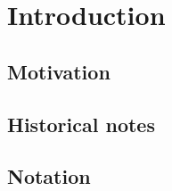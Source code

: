\chapter{Introduction}
\ifpdf
    \graphicspath{{Introduction/IntroductionFigs/PNG/}{Introduction/IntroductionFigs/PDF/}{Introduction/IntroductionFigs/}}
\else
    \graphicspath{{Introduction/IntroductionFigs/EPS/}{Introduction/IntroductionFigs/}}
\fi
\label{Intro}


\section{{Motivation}}

\section{{Historical notes}}

\section{{Notation}}



